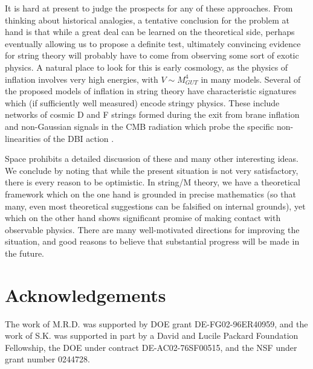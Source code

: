\documentclass[aps,amsfonts]{ar2e}
\begin{document}
It is hard at present to judge the prospects for any of these approaches.
From thinking about historical analogies,
a tentative conclusion for the
problem at hand is that while a great deal can be learned on the
theoretical side, perhaps eventually allowing us to propose a
definite test, ultimately convincing evidence for string theory will
probably have to come from observing some sort of exotic physics.
A natural place to look for this is early cosmology, as
the physics of inflation involves very high energies, with
$V \sim M_{GUT}^4$ in many models.  Several of the proposed models
of inflation in string theory have characteristic signatures which
(if sufficiently well measured) encode stringy
physics. These include networks of cosmic
D and F strings formed during the exit from brane inflation
\cite{Sarangi:2002yt,Copeland:2003bj,Dvali:2003zj} and
non-Gaussian signals in the CMB radiation which probe the specific
non-linearities of the DBI action
\cite{Alishahiha:2004eh,Babich:2004gb,Chen:2006nt}.

Space prohibits a detailed discussion of these and many other
interesting ideas.
We conclude by noting that while the present situation is not very
satisfactory, there is every reason to be optimistic.  In string/M theory,
we have a theoretical framework which on the one hand is grounded in
precise mathematics (so that many, even most theoretical suggestions can
be falsified on internal grounds), yet which on the other hand shows
significant promise of making contact with observable physics.
There are many well-motivated directions for improving the situation,
and good reasons to believe that substantial progress will be made
in the future.

\enddocument


\section*{Acknowledgements}

The work of M.R.D. was supported by DOE grant DE-FG02-96ER40959,
and the work of S.K. was supported in part by a David and Lucile Packard
Foundation Fellowship, the DOE under contract DE-AC02-76SF00515, and
the NSF under grant number 0244728.
\end{document}
